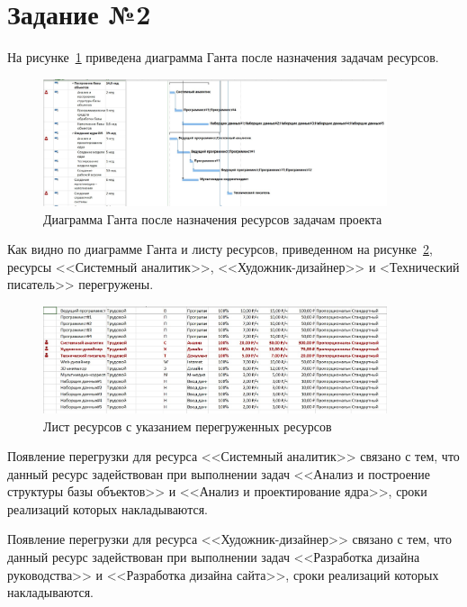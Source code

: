 \section{Задание №2}

На рисунке~\ref{fig:gant} приведена диаграмма Ганта после назначения задачам ресурсов.

\begin{figure}[H]
	\centering
	\includegraphics[width=0.9\textwidth]{img/task2/gant.jpg}
	\caption{Диаграмма Ганта после назначения ресурсов задачам проекта}
	\label{fig:gant}
\end{figure}

Как видно по диаграмме Ганта и листу ресурсов, приведенном на рисунке~\ref{fig:list_overflow}, ресурсы <<Системный аналитик>>, <<Художник-дизайнер>> и <Технический писатель>> перегружены.

\begin{figure}[H]
	\centering
	\includegraphics[width=0.9\textwidth]{img/task2/list.jpg}
	\caption{Лист ресурсов с указанием перегруженных ресурсов}
	\label{fig:list_overflow}
\end{figure}

Появление перегрузки для ресурса <<Системный аналитик>> связано с тем, что данный ресурс задействован при выполнении задач <<Анализ и построение структуры базы объектов>> и <<Анализ и проектирование ядра>>, сроки реализаций которых накладываются.

Появление перегрузки для ресурса <<Художник-дизайнер>> связано с тем, что данный ресурс задействован при выполнении задач <<Разработка дизайна руководства>> и <<Разработка дизайна сайта>>, сроки реализаций которых накладываются.

